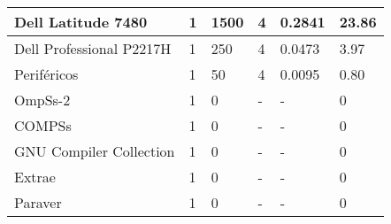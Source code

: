 \begin{longtable}{l|l|l|l|l|l|}
\multicolumn{1}{|l|}{Dell Latitude 7480}                                                                                            & 1                               & 1500                    & 4                       & 0.2841                  & 23.86                          \\ \hline
\multicolumn{1}{|l|}{Dell Professional P2217H}                                                                                      & 1                               & 250                     & 4                       & 0.0473                  & 3.97                           \\ \hline
\multicolumn{1}{|l|}{Periféricos}                                                                                                   & 1                               & 50                      & 4                       & 0.0095                  & 0.80                           \\ \hline
\multicolumn{1}{|l|}{OmpSs-2}                                                                                                       & 1                               & 0                       & -                       & -                       & 0                              \\ \hline
\multicolumn{1}{|l|}{COMPSs}                                                                                                        & 1                               & 0                       & -                       & -                       & 0                              \\ \hline
\multicolumn{1}{|l|}{GNU Compiler Collection}                                                                                       & 1                               & 0                       & -                       & -                       & 0                              \\ \hline
\multicolumn{1}{|l|}{Extrae}                                                                                                        & 1                               & 0                       & -                       & -                       & 0                              \\ \hline
\multicolumn{1}{|l|}{Paraver}                                                                                                       & 1                               & 0                       & -                       & -                       & 0                              \\ \hline

\end{longtable}
